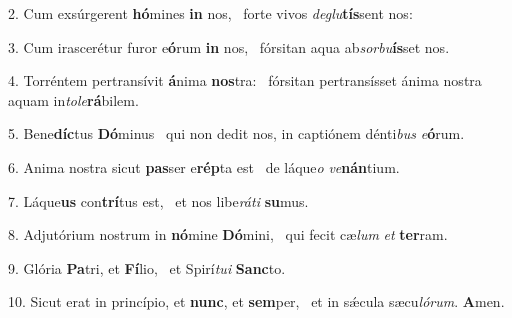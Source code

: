 2. Cum exsúrgerent \textbf{hó}mines \textbf{in} nos, \ast\  forte vivos \textit{de}\textit{glu}\textbf{tís}sent nos:\

3. Cum irascerétur furor e\textbf{ó}rum \textbf{in} nos, \ast\  fórsitan aqua ab\textit{sor}\textit{bu}\textbf{ís}set nos.\

4. Torréntem pertransívit \textbf{á}nima \textbf{nos}tra: \ast\  fórsitan pertransísset ánima nostra aquam in\textit{to}\textit{le}\textbf{rá}bilem.\

5. Bene\textbf{díc}tus \textbf{Dó}minus \ast\  qui non dedit nos, in captiónem dénti\textit{bus} \textit{e}\textbf{ó}rum.\

6. Anima nostra sicut \textbf{pas}ser e\textbf{rép}ta est \ast\  de láque\textit{o} \textit{ve}\textbf{nán}tium.\

7. Láque\textbf{us} con\textbf{trí}tus est, \ast\  et nos libe\textit{rá}\textit{ti} \textbf{su}mus.\

8. Adjutórium nostrum in \textbf{nó}mine \textbf{Dó}mini, \ast\  qui fecit cæ\textit{lum} \textit{et} \textbf{ter}ram.\

9. Glória \textbf{Pa}tri, et \textbf{Fí}lio, \ast\  et Spirí\textit{tu}\textit{i} \textbf{Sanc}to.\

10. Sicut erat in princípio, et \textbf{nunc}, et \textbf{sem}per, \ast\  et in sǽcula sæcu\textit{ló}\textit{rum}. \textbf{A}men.\

